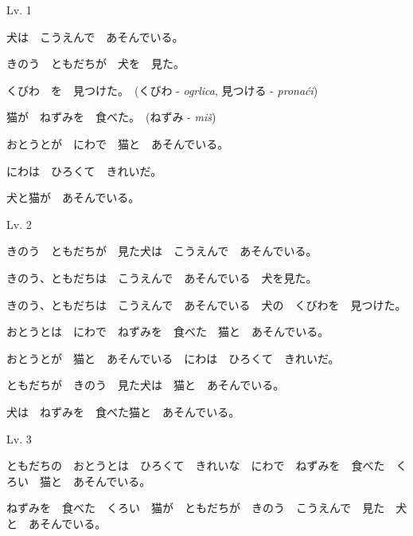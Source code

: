 
\author{Tomislav Mamić}

	
	\begin{mondai}{Lv. 1}
		\item 犬は　こうえんで　あそんでいる。
		\item きのう　ともだちが　犬を　見た。
		\item くびわ　を　見つけた。　(くびわ - \textit{ogrlica}, 見つける - \textit{pronaći})
		\item 猫が　ねずみを　食べた。　(ねずみ - \textit{miš})
		\item おとうとが　にわで　猫と　あそんでいる。
		\item にわは　ひろくて　きれいだ。
		\item 犬と猫が　あそんでいる。
	\end{mondai}

	\begin{mondai}{Lv. 2}
		\item きのう　ともだちが　見た犬は　こうえんで　あそんでいる。
		\item きのう、ともだちは　こうえんで　あそんでいる　犬を見た。
		\item きのう、ともだちは　こうえんで　あそんでいる　犬の　くびわを　見つけた。
		\item おとうとは　にわで　ねずみを　食べた　猫と　あそんでいる。
		\item おとうとが　猫と　あそんでいる　にわは　ひろくて　きれいだ。
		\item ともだちが　きのう　見た犬は　猫と　あそんでいる。
		\item 犬は　ねずみを　食べた猫と　あそんでいる。
	\end{mondai}

	\begin{mondai}{Lv. 3}
		\item ともだちの　おとうとは　ひろくて　きれいな　にわで　ねずみを　食べた　くろい　猫と　あそんでいる。
		\item ねずみを　食べた　くろい　猫が　ともだちが　きのう　こうえんで　見た　犬と　あそんでいる。
	\end{mondai}
